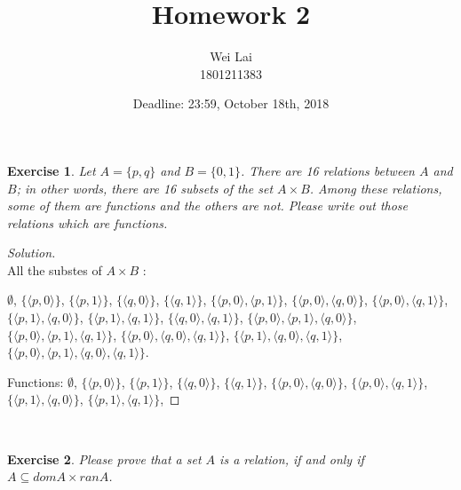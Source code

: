\documentclass[12pt,a4paper,utf8]{article}
\title{Homework 2}
\author{Wei Lai\\
1801211383}
\date{Deadline: 23:59, October 18th, 2018}
\theoremstyle{plain}
\newtheorem{exercise}{Exercise}
\begin{document}
\maketitle

\begin{exercise}
Let $A = \{ p , q \}$ and $B = \{ 0 , 1 \}$.
There are 16 relations between $A$ and $B$; in other words, there are 16 subsets of the set $A \times B$.
Among these relations, some of them are functions and the others are not.
Please write out those relations which are functions.
\end{exercise}

\begin{proof}[Solution]\ \\
    All the substes of $A \times B$ :

$\emptyset$,
$\{\langle p,0 \rangle \}$, 
$\{\langle p,1 \rangle \}$, 
$\{\langle q,0 \rangle \}$, 
$\{\langle q,1 \rangle \}$, 
$\{\langle p,0 \rangle , \langle p,1 \rangle \}$,
$\{\langle p,0 \rangle , \langle q,0 \rangle \}$,
$\{\langle p,0 \rangle , \langle q,1 \rangle \}$,
$\{\langle p,1 \rangle , \langle q,0 \rangle \}$,
$\{\langle p,1 \rangle , \langle q,1 \rangle \}$,
$\{\langle q,0 \rangle , \langle q,1 \rangle \}$,
$\{\langle p,0 \rangle , \langle p,1 \rangle , \langle q,0 \rangle \}$,
$\{\langle p,0 \rangle , \langle p,1 \rangle , \langle q,1 \rangle \}$,
$\{\langle p,0 \rangle , \langle q,0 \rangle , \langle q,1 \rangle \}$,
$\{\langle p,1 \rangle , \langle q,0 \rangle , \langle q,1 \rangle \}$,
$\{\langle p,0 \rangle , \langle p,1 \rangle , \langle q,0 \rangle , \langle q,1 \rangle \}$.

Functions:
$\emptyset$,
$\{\langle p,0 \rangle \}$,
$\{\langle p,1 \rangle \}$, 
$\{\langle q,0 \rangle \}$, 
$\{\langle q,1 \rangle \}$, 
$\{\langle p,0 \rangle , \langle q,0 \rangle \}$,
$\{\langle p,0 \rangle , \langle q,1 \rangle \}$,
$\{\langle p,1 \rangle , \langle q,0 \rangle \}$,
$\{\langle p,1 \rangle , \langle q,1 \rangle \}$,


\end{proof}

\ \\
\begin{exercise}
Please prove that a set $A$ is a relation, if and only if $A \subseteq dom A \times ran A$.
\end{exercise}
\end{document}
